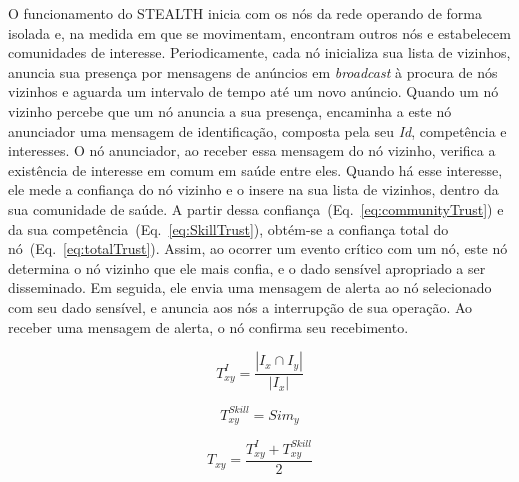 \documentclass[12pt]{article}
\begin{document}
O funcionamento do \mbox{STEALTH} inicia com os nós da rede operando de forma isolada e, na medida em que se movimentam, encontram outros nós e estabelecem comunidades de interesse. Periodicamente, cada nó inicializa sua lista de vizinhos, anuncia sua presença por mensagens de anúncios em \textit{broadcast} à procura de nós vizinhos e aguarda um intervalo de tempo até um novo anúncio.  Quando um nó vizinho percebe que um nó anuncia a sua presença, encaminha a este nó anunciador uma mensagem de identificação, composta pela seu \textit{Id}, competência e interesses. O nó anunciador, ao receber essa mensagem do nó vizinho, verifica a existência de interesse em comum em saúde entre eles. Quando há esse interesse, ele mede a confiança do nó vizinho e o insere na sua lista de vizinhos, dentro da sua comunidade de saúde. A partir dessa confiança~(Eq.~\ref{eq:communityTrust}) e da sua competência~(Eq.~\ref{eq:SkillTrust}), obtém-se a confiança total do nó~(Eq.~\ref{eq:totalTrust}). 
Assim, ao ocorrer um evento crítico com um nó, este nó determina o nó vizinho que ele mais confia, e o dado sensível apropriado a ser disseminado. Em seguida, ele envia uma mensagem de alerta ao nó selecionado com seu dado sensível, e anuncia aos nós a interrupção de sua operação. Ao receber uma mensagem de alerta, o nó confirma seu recebimento.


\vspace{-0.5cm}

\noindent
\begin{minipage}{.3\linewidth}
\centering
\begin{equation}
T_{xy}^{I} = \frac {|I_x \cap I_y|}{|I_x|}
\label{eq:communityTrust}
\end{equation}
\end{minipage}
\begin{minipage}{.3\linewidth}
\centering
\begin{equation}
T_{xy}^{Skill} = Sim_y
\label{eq:SkillTrust}
\end{equation}
\end{minipage}
\hspace{0.5cm}
\begin{minipage}{.3\linewidth}
\centering
\begin{equation}
T_{xy} = \frac{T_{xy}^{I} + T_{xy}^{Skill}}{2}
\label{eq:totalTrust}
\end{equation}
\end{minipage}
\end{document}
